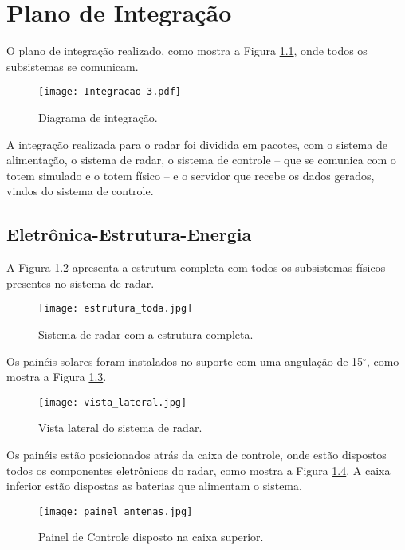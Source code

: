 


\chapter{Plano de Integração}

O plano de integração realizado, como mostra a Figura \ref{fig:planejamento_integracao}, onde todos os subsistemas se comunicam.

\begin{figure}[H]
    \centering
    \texttt{[image: Integracao-3.pdf]}
    \caption{Diagrama de integração.}
    \label{fig:planejamento_integracao}
\end{figure}

A integração realizada para o radar foi dividida em pacotes, com o sistema de alimentação, o sistema de radar, o sistema de controle -- que se comunica com o totem simulado e o totem físico -- e o servidor que recebe os dados gerados, vindos do sistema de controle.

\section{Eletrônica-Estrutura-Energia}

A Figura \ref{fig:estrutura} apresenta a estrutura completa com todos os subsistemas físicos presentes no sistema de radar.

\begin{figure}[H]
    \centering
    \texttt{[image: estrutura\_toda.jpg]}
    \caption{Sistema de radar com a estrutura completa.}
    \label{fig:estrutura}
\end{figure}

Os painéis solares foram instalados no suporte com uma angulação de 15$^{\circ}$, como mostra a Figura \ref{fig:vista}.

\begin{figure}[H]
    \centering
    \texttt{[image: vista\_lateral.jpg]}
    \caption{Vista lateral do sistema de radar.}
    \label{fig:vista}
\end{figure}

Os painéis estão posicionados atrás da caixa de controle, onde estão dispostos todos os componentes eletrônicos do radar, como mostra a Figura \ref{fig:painel}. A caixa inferior estão dispostas as baterias que alimentam o sistema.
\begin{figure}[H]
    \centering
    \texttt{[image: painel\_antenas.jpg]}
    \caption{Painel de Controle disposto na caixa superior.}
    \label{fig:painel}
\end{figure}

